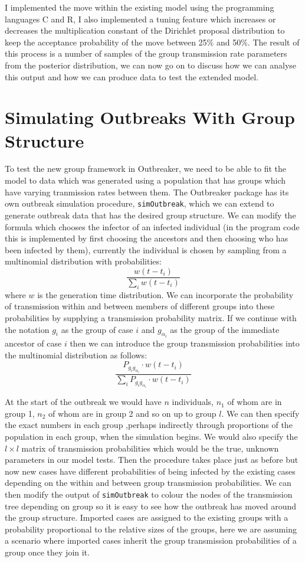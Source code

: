 \documentclass[11pt,a4paper]{report}
\begin{document}
I implemented the move within the existing model using the programming languages C and R, I also implemented a tuning feature which increases or decreases the multiplication constant of the Dirichlet proposal distribution to keep the acceptance probability of the move between 25\% and 50\%. The result of this process is a number of samples of the group transmission rate parameters from the posterior distribution, we can now go on to discuss how we can analyse this output and how we can produce data to test the extended model.




\section{Simulating Outbreaks With Group Structure}
To test the new group framework in Outbreaker, we need to be able to fit the model to data which was generated using a population that has groups which have varying tranmission rates between them.
The Outbreaker package has its own outbreak simulation procedure, {\tt simOutbreak}, which we can extend to generate outbreak data that has the desired group structure. We can modify the formula which chooses the infector of an infected individual (in the program code this is implemented by first choosing the ancestors and then choosing who has been infected by them), currently the individual is chosen by sampling from a multinomial distribution with probabilities:
\[ \frac{w(t-t_i)}{\sum_i{w(t-t_i)}} \]
where $w$ is the generation time distribution. We can incorporate the probability of transmission within and between members of different groups into these probabilities by supplying a transmission probability matrix. If we continue with the notation $g_{i}$ as the group of case $i$ and $g_{\alpha_{i}}$ as the group of the immediate ancestor of case $i$ then we can introduce the group transmission probabilities into the multinomial distribution as follows:
\[ \frac{P_{g_{i}g_{\alpha_{i}}} \cdot w(t-t_i)}{\sum_i{P_{g_{i}g_{\alpha_{i}}} \cdot w(t-t_i)}}\]

At the start of the outbreak we would have $n$ individuals, $n_1$ of whom are in group 1, $n_2$ of whom are in group 2 and so on up to group $l$. We can then specify the exact numbers in each group ,perhaps indirectly through proportions of the population in each group, when the simulation begins. We would also specify the $l \times l$ matrix of transmission probabilities which would be the true, unknown parameters in our model tests. Then the procedure takes place just as before but now new cases have different probabilities of being infected by the existing cases depending on the within and between group transmission probabilities. We can then modify the output of {\tt simOutbreak} to colour the nodes of the transmission tree depending on group so it is easy to see how the outbreak has moved around the group structure. Imported cases are assigned to the existing groups with a probability proportional to the relative sizes of the groups, here we are assuming a scenario where imported cases inherit the group transmission probabilities of a group once they join it.
\end{document}
